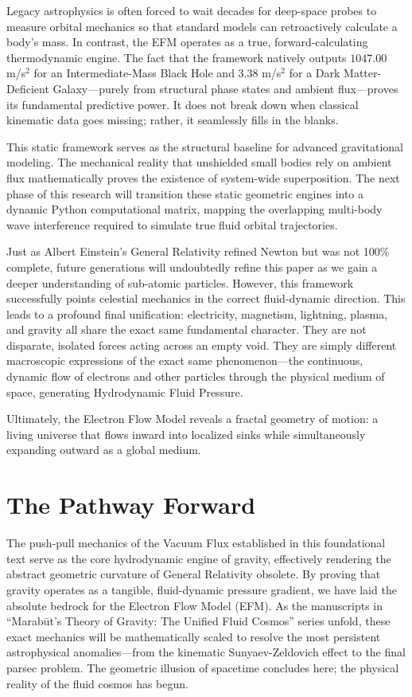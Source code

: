 \documentclass[11pt, a4paper]{article}
\begin{document}
  Legacy astrophysics is often forced to wait decades for deep-space probes to measure orbital mechanics so that standard models can retroactively calculate a body's mass. In contrast, the EFM operates as a true, forward-calculating thermodynamic engine. The fact that the framework natively outputs $1047.00$ m/s$^2$ for an Intermediate-Mass Black Hole and $3.38$ m/s$^2$ for a Dark Matter-Deficient Galaxy---purely from structural phase states and ambient flux---proves its fundamental predictive power. It does not break down when classical kinematic data goes missing; rather, it seamlessly fills in the blanks.

  This static framework serves as the structural baseline for advanced gravitational modeling. The mechanical reality that unshielded small bodies rely on ambient flux mathematically proves the existence of system-wide superposition. The next phase of this research will transition these static geometric engines into a dynamic Python computational matrix, mapping the overlapping multi-body wave interference required to simulate true fluid orbital trajectories.

  Just as Albert Einstein's General Relativity refined Newton but was not 100\% complete, future generations will undoubtedly refine this paper as we gain a deeper understanding of sub-atomic particles. However, this framework successfully points celestial mechanics in the correct fluid-dynamic direction. This leads to a profound final unification: electricity, magnetism, lightning, plasma, and gravity all share the exact same fundamental character. They are not disparate, isolated forces acting across an empty void. They are simply different macroscopic expressions of the exact same phenomenon---the continuous, dynamic flow of electrons and other particles through the physical medium of space, generating Hydrodynamic Fluid Pressure.

  Ultimately, the Electron Flow Model reveals a fractal geometry of motion: a living universe that flows inward into localized sinks while simultaneously expanding outward as a global medium.

\section*{The Pathway Forward}
  The push-pull mechanics of the Vacuum Flux established in this foundational text serve as the core hydrodynamic engine of gravity, effectively rendering the abstract geometric curvature of General Relativity obsolete. By proving that gravity operates as a tangible, fluid-dynamic pressure gradient, we have laid the absolute bedrock for the Electron Flow Model (EFM). As the manuscripts in ``Marab\={u}t's Theory of Gravity: The Unified Fluid Cosmos'' series unfold, these exact mechanics will be mathematically scaled to resolve the most persistent astrophysical anomalies---from the kinematic Sunyaev-Zeldovich effect to the final parsec problem. The geometric illusion of spacetime concludes here; the physical reality of the fluid cosmos has begun.
  
\end{document}
